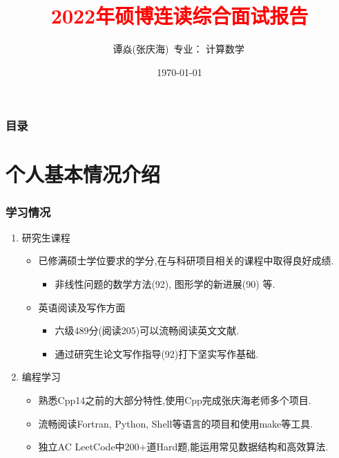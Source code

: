 \documentclass[UTF8]{ctexbeamer}	%
\title{\textcolor{red}{2022年硕博连读综合面试报告}}
\author{谭焱(张庆海)\, \newline   \newline 专业： 计算数学\, 
 }
\date{\today}
\theoremstyle{plain}
\theoremstyle{definition}
\newtheorem{emt}{}[section]
\theoremstyle{remark}
\numberwithin{equation}{section}
\begin{document}

\begin{frame}
\titlepage
\end{frame}


\begin{frame}
    \frametitle{目录}
    \tableofcontents
  \end{frame}

\section{个人基本情况介绍}


        


\begin{frame}[fragile]
    \frametitle{学习情况}
\begin{enumerate}
    \item 研究生课程
    \begin{itemize}
        \item 已修满硕士学位要求的学分,在与科研项目相关的课程中取得良好成绩.
        \begin{itemize}
            \item 非线性问题的数学方法(92), 图形学的新进展(90) 等.
        \end{itemize}
        \item 英语阅读及写作方面
        \begin{itemize}
            \item 六级489分(阅读205)可以流畅阅读英文文献.
            \item 通过研究生论文写作指导(92)打下坚实写作基础.
        \end{itemize}
    \end{itemize}
    \item 编程学习
    \begin{itemize}
        \item 熟悉Cpp14之前的大部分特性,使用Cpp完成张庆海老师多个项目.
        \item 流畅阅读Fortran, Python, Shell等语言的项目和使用make等工具.
        \item 独立AC LeetCode中200+道Hard题,能运用常见数据结构和高效算法.
    \end{itemize}
\end{enumerate}
\end{frame}
\end{document}
